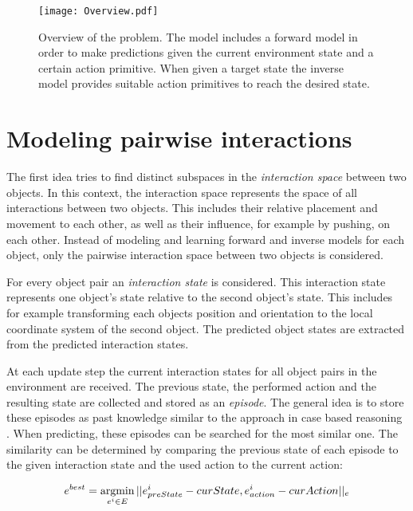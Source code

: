 \begin{figure}
	\centering
	\texttt{[image: Overview.pdf]}
	\caption{Overview of the problem. The model includes a forward model in order to make predictions given the current environment state and a certain action primitive. When given a target state the inverse model provides suitable action primitives to reach the desired state.}
	\label{fig:overview}
\end{figure}

\section{Modeling pairwise interactions \label{sec:pairInt}}

The first idea tries to find distinct subspaces in the \textit{interaction space} between two objects. In this context, the interaction space represents the space of all interactions between two objects. This includes their relative placement and movement to each other, as well as their influence, for example by pushing, on each other. Instead of modeling and learning forward and inverse models for each object, only the pairwise interaction space between two objects is considered.  

For every object pair an \textit{interaction state} is considered. This interaction state represents one object's state relative to the second object's state. This includes for example transforming each objects position and orientation to the local coordinate system of the second object. %
The predicted object states are extracted from the predicted interaction states.

At each update step the current interaction states for all object pairs in the environment are received. The previous state, the performed action and the resulting state are collected and stored as an \textit{episode}. The general idea is to store these episodes as past knowledge similar to the approach in case based reasoning \cite{cbr}. When predicting, these episodes can be searched for the most similar one. The similarity can be determined by comparing the previous state of each episode to the given interaction state and the used action to the current action:

\begin{equation}
	e^{best} = \argmin_{e^i \in E} ||e^i_{preState}-curState, e^i_{action}-curAction||_e
	\label{eq:bestEpisode}
\end{equation}


